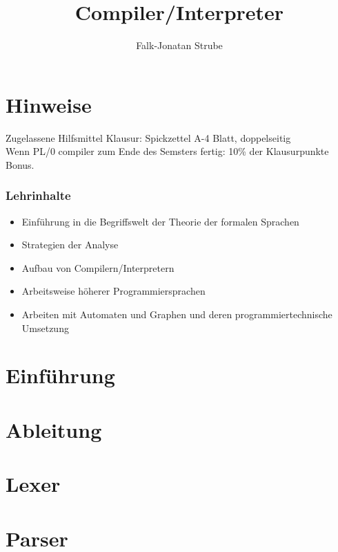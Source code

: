\documentclass{scrreprt}
\title{Compiler/Interpreter}
\author{Falk-Jonatan Strube}
\begin{document}
\maketitle
\tableofcontents

\chapter*{Hinweise}

Zugelassene Hilfsmittel Klausur: Spickzettel A-4 Blatt, doppelseitig\\
Wenn PL/0 compiler zum Ende des Semsters fertig: 10\% der Klausurpunkte Bonus.

\subsection*{Lehrinhalte}
\begin{itemize}
\item Einführung in die Begriffswelt der Theorie der formalen Sprachen
\item Strategien der Analyse
\item Aufbau von Compilern/Interpretern
\item Arbeitsweise höherer Programmiersprachen
\item Arbeiten mit Automaten und Graphen und deren programmiertechnische Umsetzung
\end{itemize}

\chapter{Einführung}


\chapter{Ableitung}


\chapter{Lexer}


\chapter{Parser}

\end{document}
